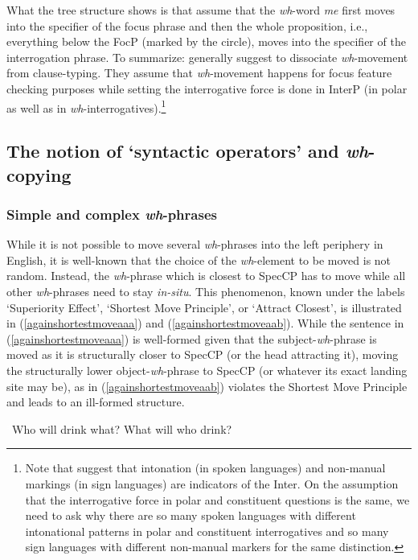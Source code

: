 \noindent What the tree structure shows is that \citet{aboh2010sa} assume that the \textit{wh}-word \textit{me} first moves into the specifier of the focus phrase and then the whole proposition, i.e., everything below the FocP (marked by the circle), moves into the specifier of the interrogation phrase. To summarize: \citet{aboh2010sa} generally suggest to dissociate \textit{wh}-movement from clause-typing. They assume that \textit{wh}-movement happens for focus feature checking purposes while setting the interrogative force is done in InterP (in polar as well as in \textit{wh}-interrogatives).\footnote{ Note that \citet{aboh2010sa} suggest that intonation (in spoken languages) and non-manual markings (in sign languages) are indicators of the Inter\textdegree . On the assumption that the interrogative force in polar and constituent questions is the same, we need to ask why there are so many spoken languages with different intonational patterns in polar and constituent interrogatives and so many sign languages with different non-manual markers for the same distinction.} 

\subsection{The notion of `syntactic operators' and \textit{wh}-copying}\label{syntaxoperators}
\subsubsection{Simple and complex \textit{wh}-phrases}
While it is not possible to move several \textit{wh}-phrases into the left periphery in English, it is well-known that the choice of the \textit{wh}-element to be moved is not random. Instead, the \textit{wh}-phrase which is closest to SpecCP has to move while all other \textit{wh}-phrases need to stay \textit{in-situ}. This phenomenon, known under the labels `Superiority Effect', `Shortest Move Principle', or `Attract Closest', is illustrated in (\ref{againshortestmoveaaa}) and (\ref{againshortestmoveaab}). While the sentence in (\ref{againshortestmoveaaa}) is well-formed given that the subject-\textit{wh}-phrase is moved as it is structurally closer to SpecCP (or the head attracting it), moving the structurally lower object-\textit{wh}-phrase to SpecCP (or whatever its exact landing site may be), as in (\ref{againshortestmoveaab}) violates the Shortest Move Principle and leads to an ill-formed structure.

\begin{exe}
\ex\label{againshortestmove}\begin{xlist}
\ex \textcolor{white}{*}Who will drink what? \label{againshortestmoveaaa}
\ex *What will who drink? \label{againshortestmoveaab}
\end{xlist}
\end{exe}

